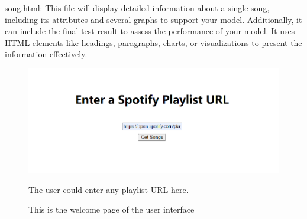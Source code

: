 \documentclass{article}
\begin{document}
song.html: This file will display detailed information about a single song, including its attributes and several graphs to support your model. Additionally, it can include the final test result to assess the performance of your model. It uses HTML elements like headings, paragraphs, charts, or visualizations to present the information effectively.
\begin{figure}[h]
\centering
\includegraphics[width=1\textwidth]{1.png}
\caption{This is the welcome page of the user interface}
The user could enter any playlist URL here.
\label{fig:enter-label}
\end{figure}
\end{document}
